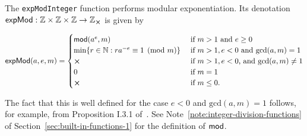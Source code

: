 \label{note:exp-mod-integer}
The \texttt{expModInteger} function performs modular exponentiation.  Its denotation
$\mathsf{expMod}: \Z \times \Z \times \Z \rightarrow \Z_{\errorX}$ is given by

$$
\mathsf{expMod}(a,e,m) =
  \begin{cases}
     \modfn(a^e,m) & \text{if $m > 1$ and $e \geq 0$}\\
     \min\{r \in \N: ra^{-e} \equiv 1\pmod{m}\}\  & \text{if $m > 1, e < 0$ and $\mathrm{gcd}(a,m) = 1$}\\
     \errorX & \text{if $m>1,e<0$, and $\mathrm{gcd}(a,m) \neq 1$}\\
     0 & \text{if $m=1$}\\
     \errorX & \text{if $m \leq 0$.}
  \end{cases}
$$ 

\noindent The fact that this is well defined for the case $e<0$ and $\mathrm{gcd}(a,m) = 1$
follows, for example, from Proposition I.3.1 of~\cite{Koblitz-GTM}.  See
Note~\ref{note:integer-division-functions} of
Section~\ref{sec:built-in-functions-1} for the definition of $\operatorname{\mathsf{mod}}$.



